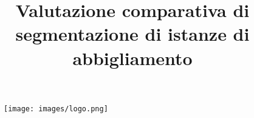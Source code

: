 \documentclass[12pt,a4paper,oneside,openright]{book}
\begin{document}
\begin{figure}
	\centering
	\texttt{[image: images/logo.png]}
\end{figure}

\title{Valutazione comparativa di segmentazione di istanze di abbigliamento}

\providecommand{\entitle}{Comparative evaluation of instance-based apparel segmentation}

\providecommand{\autore}{Pier Carlo Cadoppi}                        %
\providecommand{\matricola}{276645}
\providecommand{\principaladviser}{Chiar.mo~Prof. Andrea Prati}  %
\providecommand{\firstreader}{Dott.~Leonardo Rossi}            %
\providecommand{\annoacc}{2018/19}
\providecommand{\tipo}{Triennale} %
\providecommand{\corso}{Informatica, Elettronica e delle Telecomunicazioni} %
\providecommand{\subtitle}{Detecting clothing and footwear in real world images} %


\titlep

\frontmatter

   
   \tableofcontents
   \listoffigures
   \listoftables

\clearpage

\mainmatter
 
 
 
 
 
 

\appendix
\renewcommand{\chaptermark}[1]{\markboth{{\appendixname}\ \thechapter.\hspace{1em}#1}{}}

\clearpage
{}

%



\end{document}
